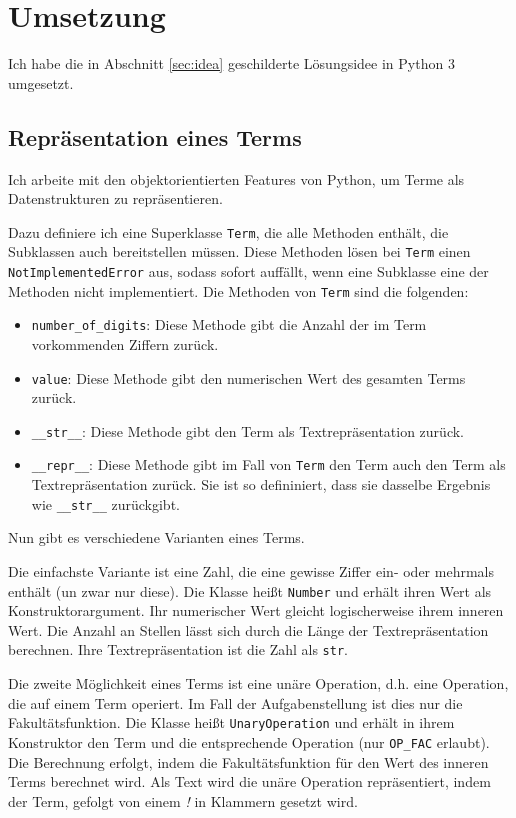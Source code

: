 \documentclass[a4paper,10pt,ngerman]{scrartcl}
\begin{document}
\section{Umsetzung}
Ich habe die in Abschnitt \ref{sec:idea} geschilderte Lösungsidee in Python 3 umgesetzt.

\subsection{Repräsentation eines Terms}
Ich arbeite mit den objektorientierten Features von Python, um Terme als Datenstrukturen zu repräsentieren.

Dazu definiere ich eine Superklasse \texttt{Term}, die alle Methoden enthält, die Subklassen auch bereitstellen müssen.
Diese Methoden lösen bei \texttt{Term} einen \texttt{NotImplementedError} aus, sodass sofort auffällt, wenn eine Subklasse eine der Methoden nicht implementiert.
Die Methoden von \texttt{Term} sind die folgenden:
\begin{itemize}
  \item \texttt{number\_of\_digits}: Diese Methode gibt die Anzahl der im Term vorkommenden Ziffern zurück.
  \item \texttt{value}: Diese Methode gibt den numerischen Wert des gesamten Terms zurück.
  \item \texttt{\_\_str\_\_}: Diese Methode gibt den Term als Textrepräsentation zurück.
  \item \texttt{\_\_repr\_\_}: Diese Methode gibt im Fall von \texttt{Term} den Term auch den Term als Textrepräsentation zurück.
  Sie ist so defininiert, dass sie dasselbe Ergebnis wie \texttt{\_\_str\_\_} zurückgibt.
\end{itemize}

Nun gibt es verschiedene Varianten eines Terms.

Die einfachste Variante ist eine Zahl, die eine gewisse Ziffer ein- oder mehrmals enthält (un zwar nur diese).
Die Klasse heißt \texttt{Number} und erhält ihren Wert als Konstruktorargument.
Ihr numerischer Wert gleicht logischerweise ihrem inneren Wert.
Die Anzahl an Stellen lässt sich durch die Länge der Textrepräsentation berechnen.
Ihre Textrepräsentation ist die Zahl als \texttt{str}.

Die zweite Möglichkeit eines Terms ist eine unäre Operation, d.h. eine Operation, die auf einem Term operiert.
Im Fall der Aufgabenstellung ist dies nur die Fakultätsfunktion.
Die Klasse heißt \texttt{UnaryOperation} und erhält in ihrem Konstruktor den Term und die entsprechende Operation (nur \texttt{OP\_FAC} erlaubt).
Die Berechnung erfolgt, indem die Fakultätsfunktion für den Wert des inneren Terms berechnet wird.
Als Text wird die unäre Operation repräsentiert, indem der Term, gefolgt von einem \textit{!} in Klammern gesetzt wird.
\end{document}
